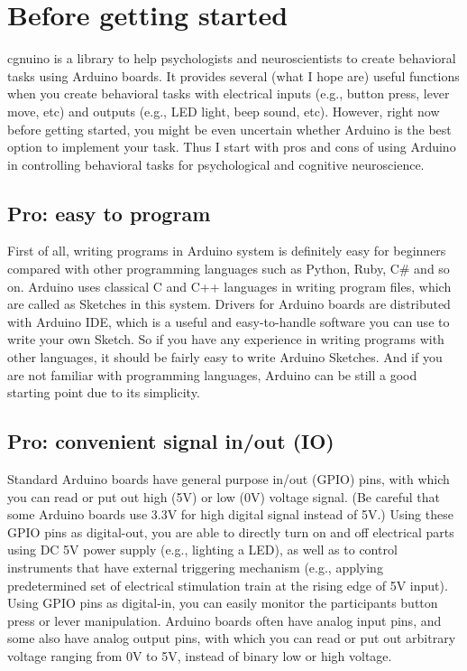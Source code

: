 \hypertarget{p1_s1}{}\section{Before getting started}\label{p1_s1}
cgnuino is a library to help psychologists and neuroscientists to create behavioral tasks using Arduino boards. It provides several (what I hope are) useful functions when you create behavioral tasks with electrical inputs (e.\+g., button press, lever move, etc) and outputs (e.\+g., L\+ED light, beep sound, etc). However, right now before getting started, you might be even uncertain whether Arduino is the best option to implement your task. Thus I start with pros and cons of using Arduino in controlling behavioral tasks for psychological and cognitive neuroscience.\hypertarget{p1_ss1}{}\subsection{Pro\+: easy to program}\label{p1_ss1}
First of all, writing programs in Arduino system is definitely easy for beginners compared with other programming languages such as Python, Ruby, C\# and so on. Arduino uses classical C and C++ languages in writing program files, which are called as Sketches in this system. Drivers for Arduino boards are distributed with Arduino I\+DE, which is a useful and easy-\/to-\/handle software you can use to write your own Sketch. So if you have any experience in writing programs with other languages, it should be fairly easy to write Arduino Sketches. And if you are not familiar with programming languages, Arduino can be still a good starting point due to its simplicity.\hypertarget{p1_ss2}{}\subsection{Pro\+: convenient signal in/out (\+I\+O)}\label{p1_ss2}
Standard Arduino boards have general purpose in/out (G\+P\+IO) pins, with which you can read or put out high (5V) or low (0V) voltage signal. (Be careful that some Arduino boards use 3.\+3V for high digital signal instead of 5V.) Using these G\+P\+IO pins as digital-\/out, you are able to directly turn on and off electrical parts using DC 5V power supply (e.\+g., lighting a L\+ED), as well as to control instruments that have external triggering mechanism (e.\+g., applying predetermined set of electrical stimulation train at the rising edge of 5V input). Using G\+P\+IO pins as digital-\/in, you can easily monitor the participant\textquotesingle{}s button press or lever manipulation. Arduino boards often have analog input pins, and some also have analog output pins, with which you can read or put out arbitrary voltage ranging from 0V to 5V, instead of binary low or high voltage.

